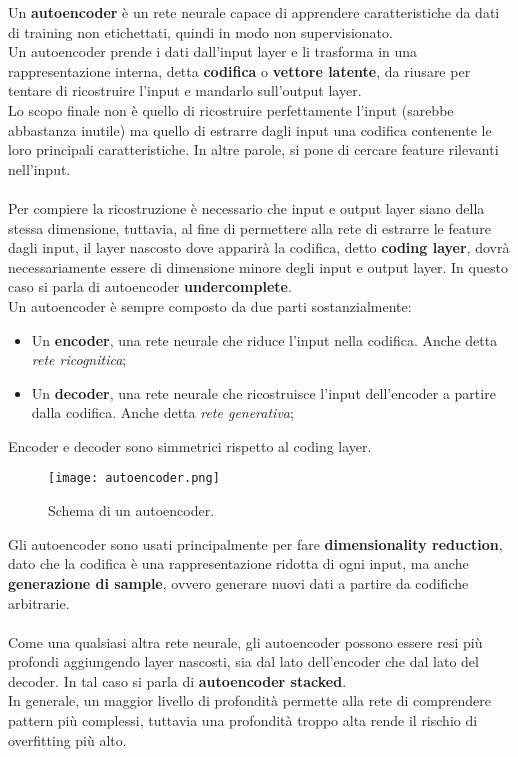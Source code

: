 Un \textbf{autoencoder} è un rete neurale capace di apprendere caratteristiche da dati di training non etichettati, quindi in modo non supervisionato.\\
Un autoencoder prende i dati dall'input layer e li trasforma in una rappresentazione interna, detta \textbf{codifica} o \textbf{vettore latente}, da riusare per tentare di ricostruire l'input e mandarlo sull'output layer.\\
Lo scopo finale non è quello di ricostruire perfettamente l'input (sarebbe abbastanza inutile) ma quello di estrarre dagli input una codifica contenente le loro principali caratteristiche. In altre parole, si pone di cercare feature rilevanti nell'input.\\
\\
Per compiere la ricostruzione è necessario che input e output layer siano della stessa dimensione, tuttavia, al fine di permettere alla rete di estrarre le feature dagli input, il layer nascosto dove apparirà la codifica, detto \textbf{coding layer}, dovrà necessariamente essere di dimensione minore degli input e output layer. In questo caso si parla di autoencoder \textbf{undercomplete}.\\
Un autoencoder è sempre composto da due parti sostanzialmente:
\begin{itemize}
	\item Un \textbf{encoder}, una rete neurale che riduce l'input nella codifica. Anche detta \textit{rete ricognitica};
	\item Un \textbf{decoder}, una rete neurale che ricostruisce l'input dell'encoder a partire dalla codifica. Anche detta \textit{rete generativa};
\end{itemize}
Encoder e decoder sono simmetrici rispetto al coding layer.
\begin{figure}[H]
	\centering
	\texttt{[image: autoencoder.png]}
	\caption{Schema di un autoencoder.}
	\label{fig:autoencoder}
\end{figure}
Gli autoencoder sono usati principalmente per fare \textbf{dimensionality reduction}, dato che la codifica è una rappresentazione ridotta di ogni input, ma anche \textbf{generazione di sample}, ovvero generare nuovi dati a partire da codifiche arbitrarie.\\
\\
Come una qualsiasi altra rete neurale, gli autoencoder possono essere resi più profondi aggiungendo layer nascosti, sia dal lato dell'encoder che dal lato del decoder. In tal caso si parla di \textbf{autoencoder stacked}.\\
In generale, un maggior livello di profondità permette alla rete di comprendere pattern più complessi, tuttavia una profondità troppo alta rende il rischio di overfitting più alto.


